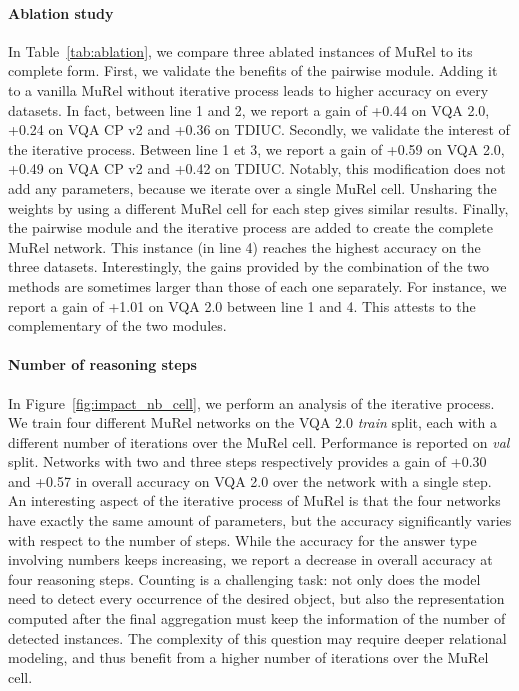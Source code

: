 \documentclass[10pt,twocolumn,letterpaper]{article}
\begin{document}
\paragraph{Ablation study} In Table~\ref{tab:ablation}, we compare three ablated instances of MuRel to its complete form.
First, we validate the benefits of the pairwise module. Adding it to a vanilla MuRel without iterative process leads to higher accuracy on every datasets. In fact, between line 1 and 2, we report a gain of +0.44 on VQA 2.0, +0.24 on VQA CP v2 and +0.36 on TDIUC.
Secondly, we validate the interest of the iterative process. Between line 1 et 3, we report a gain of +0.59 on VQA 2.0, +0.49 on VQA CP v2 and +0.42 on TDIUC.
Notably, this modification does not add any parameters, because we iterate over a single MuRel cell. 
Unsharing the weights by using a different MuRel cell for each step gives similar results.
Finally, the pairwise module and the iterative process are added to create the complete MuRel network. This instance (in line 4) reaches the highest accuracy on the three datasets. Interestingly, the gains provided by the combination of the two methods are sometimes larger than those of each one separately. For instance, we report a gain of +1.01 on VQA 2.0 between line 1 and 4. This attests to the complementary of the two modules.

\paragraph{Number of reasoning steps} In Figure~\ref{fig:impact_nb_cell},
we perform an analysis of the iterative process. 
We train four different MuRel networks on the VQA 2.0 \textit{train} split, each with a different number of iterations over the MuRel cell. Performance is reported on \textit{val} split.
Networks with two and three steps respectively provides a gain of +0.30 and +0.57 in overall accuracy on VQA 2.0 over the network with a single step. 
An interesting aspect of the iterative process of MuRel is that the four networks have exactly the same amount of parameters, but the accuracy significantly varies with respect to the number of steps.
While the accuracy for the answer type involving numbers keeps increasing, we report a decrease in overall accuracy at four reasoning steps. 
Counting is a challenging task: not only does the model need to detect every occurrence of the desired object, but also the representation computed after the final aggregation must keep the information of the number of detected instances. The complexity of this question may require deeper relational modeling, and thus benefit from a higher number of iterations over the MuRel cell.
\end{document}
